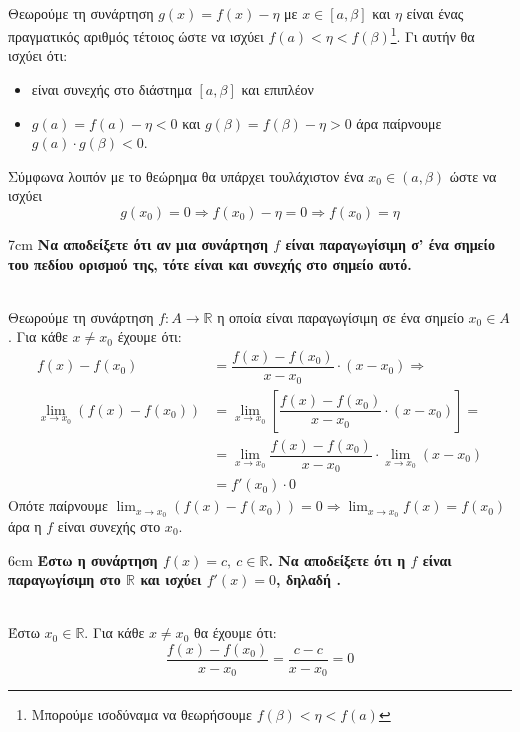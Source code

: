 \textbf{}\\
Θεωρούμε τη συνάρτηση $ g(x)=f(x)-\eta $ με $ x\in[a,\beta] $ και $ \eta $ είναι ένας πραγματικός αριθμός τέτοιος ώστε να ισχύει $ f(a)<\eta<f(\beta) $\footnote{Μπορούμε ισοδύναμα να θεωρήσουμε $ f(\beta)<\eta<f(a) $}. Γι αυτήν θα ισχύει ότι:
\begin{itemize}
\item είναι συνεχής στο διάστημα $ [a,\beta] $ και επιπλέον
\item $ g(a)=f(a)-\eta<0 $ και $ g(\beta)=f(\beta)-\eta>0 $ άρα παίρνουμε $ g(a)\cdot g(\beta)<0 $.
\end{itemize}
Σύμφωνα λοιπόν με το θεώρημα  θα υπάρχει τουλάχιστον ένα $ x_0\in(a,\beta) $ ώστε να ισχύει \[ g(x_0)=0\Rightarrow f(x_0)-\eta=0\Rightarrow f(x_0)=\eta \]
\begin{Thewrhmabox}{7cm}
\label{thewrhma:paragwgisimh_synechhs}
\textbf{Να αποδείξετε ότι αν μια συνάρτηση $f$ είναι παραγωγίσιμη σ’ ένα σημείο  του πεδίου ορισμού της, τότε είναι και συνεχής στο σημείο αυτό. }
\end{Thewrhmabox}
\textbf{}\\
Θεωρούμε τη συνάρτηση $ f:A\to\mathbb{R} $ η οποία είναι παραγωγίσιμη σε ένα σημείο $ x_0\in A $. Για κάθε $ x\neq x_0 $ έχουμε ότι:
\begin{align*}
f(x)-f(x_0)&=\dfrac{f(x)-f(x_0)}{x-x_0}\cdot (x-x_0)\Rightarrow\\
\lim_{x\to x_0}{\left( f(x)-f(x_0)\right) }&=\lim_{x\to x_0}{\left[
\dfrac{f(x)-f(x_0)}{x-x_0}\cdot (x-x_0)\right]}=\\
&=\lim_{x\to x_0}{
\dfrac{f(x)-f(x_0)}{x-x_0}}\cdot \lim_{x\to x_0}{(x-x_0)}\\
&=f'(x_0)\cdot 0
\end{align*}
Οπότε παίρνουμε $ {\displaystyle \lim_{x\to x_0}{\left( f(x)-f(x_0)\right) }=0\Rightarrow \lim_{x\to x_0}{f(x)}=f(x_0)} $ άρα η $ f $ είναι συνεχής στο $ x_0 $.
\begin{Thewrhmabox}{6cm}
\label{thewrhma:paragwgos_statherhs}
\textbf{Έστω η συνάρτηση $f(x)=c,\ c\in\mathbb{R}$. Να αποδείξετε ότι η $f$ είναι παραγωγίσιμη στο $\mathbb{R}$ και ισχύει $f'(x)=0$, δηλαδή .}
\end{Thewrhmabox}
\textbf{}\\
Έστω $x_0\in\mathbb{R}$. Για κάθε $ x\neq x_0 $ θα έχουμε ότι:
\[ \dfrac{f(x)-f(x_0)}{x-x_0}=\dfrac{c-c}{x-x_0}=0 \]
